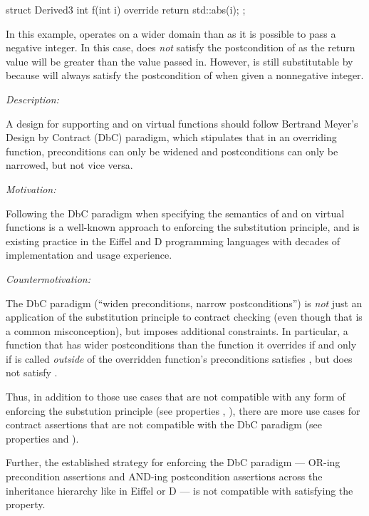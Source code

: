\begin{codeblock}
struct Derived3 {
  int f(int i) override {
    return std::abs(i);
  }
};
\end{codeblock}
In this example,  operates on a wider domain than  as it is possible to pass a negative integer. In this case,   does \emph{not} satisfy the postcondition of  as the return value will be greater than the value passed in. However,  is still substitutable by  because  will always satisfy the postcondition of  when given a nonnegative integer.


\emph{Description:}

A design for supporting  and  on virtual functions should follow Bertrand Meyer's Design by Contract (DbC) paradigm, which stipulates that in an overriding function, preconditions can only be widened and postconditions can only be narrowed, but not vice versa.

\emph{Motivation:}

Following the DbC paradigm when  specifying the semantics of  and  on virtual functions is a well-known approach to enforcing the substitution principle, and is existing practice in the Eiffel and D programming languages with decades of implementation and usage experience.

\emph{Countermotivation:} 

The DbC paradigm (``widen preconditions, narrow postconditions'') is \emph{not} just an application of the substitution principle to contract checking (even though that is a common misconception), but imposes additional constraints. In particular, a function that has wider postconditions than the function it overrides if and only if is called \emph{outside} of the overridden function's preconditions satisfies , but does not satisfy . 

Thus,  in addition to those use cases that are not compatible with any form of enforcing the substution principle (see properties , ), there are more use cases for contract assertions that are not compatible with the DbC paradigm (see properties   and ).

Further, the established strategy for enforcing the DbC paradigm --- OR-ing precondition assertions and AND-ing postcondition assertions across the inheritance hierarchy like in Eiffel or D --- is not compatible with satisfying the  property.

